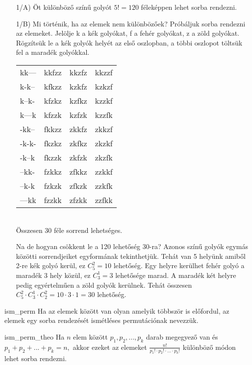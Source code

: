 \begin{solution}
	\begin{itemize}
		\item[1/A)] Öt különböző színű golyót $5!=120$ féleképpen lehet sorba rendezni.
		\item[1/B)] Mi történik, ha az elemek nem különbözőek? Próbáljuk sorba rendezni
		az elemeket. Jelölje k a kék golyókat, f a fehér golyókat, z a zöld
		golyókat. Rögzítsük le a kék golyók helyét az első oszlopban, a többi
		oszlopot töltsük fel a maradék golyókkal.

\begin{tabular}{l|l|l|l}
kk---  & kkfzz & kkzfz & kkzzf \tabularnewline
k-k--  & kfkzz & kzkfz & kzkzf \tabularnewline
k--k- & kfzkz & kzfkz & kzzkf\tabularnewline
k---k & kfzzk & kzfzk & kzzfk\tabularnewline
-kk-- & fkkzz & zkkfz & zkkzf\tabularnewline
-k-k- & fkzkz & zkfkz & zkzkf\tabularnewline
-k--k & fkzzk & zkfzk & zkzfk\tabularnewline
--kk- & fzkkz & zfkkz & zzkkf\tabularnewline
--k-k & fzkzk & zfkzk & zzkfk\tabularnewline
---kk & fzzkk & zfzkk & zzfkk\tabularnewline
\end{tabular}\\
 Összesen 30 féle sorrend lehetséges. 
 
 Na de hogyan csökkent le a 120
lehetőség 30-ra? Azonos színű golyók egymás közötti sorrendjeiket
egyformának tekinthetjük. Tehát van 5 helyünk amiből 2-re kék golyó
kerül, ez $C_{5}^{2}=10$ lehetőség. Egy helyre kerülhet fehér golyó
a maradék 3 hely közül, ez $C_{3}^{1}=3$ lehetősége marad. A maradék
két helyre pedig egyértelműen a zöld golyók kerülnek. Tehát összesen
$C_{5}^{2}\cdot C_{3}^{1}\cdot C_{2}^{2}=10\cdot3\cdot1=30$ lehetőség. 
	\end{itemize}
\end{solution}
\begin{definition}{ism_perm}
Ha az elemek között van olyan amelyik többször is előfordul, az elemek
egy sorba rendezését ismétléses permutációnak nevezzük.
\end{definition}

\begin{theorem}{ism_perm_theo}
Ha $n$ elem között $p_{1},p_{2},...,p_{k}$ darab megegyező van és
$p_{1}+p_{2}+...+p_{k}=n,$ akkor ezeket az elemeket $\frac{n!}{p_{1}!\cdot p_{2}!\cdot...\cdot p_{k}!}$
különböző módon lehet sorba rendezni. \cite{Moz2}
\end{theorem}

